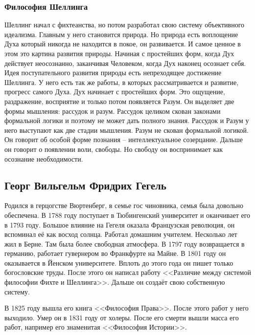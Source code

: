\subsubsection{Философия Шеллинга}

Шеллинг начал с фихтеанства, но потом разработал свою систему объективного идеализма. Главным у него становится природа. Но природа есть воплощение Духа который никогда не находится в покое, он развивается. И самое ценное в этом это картина развития природы. Начиная с простейших форм, когда Дух действует неосознанно, заканчивая Человеком, когда Дух наконец осознает себя. Идея поступательного развития природы есть непреходящее достижение Шеллинга. У него есть так же работы, в которых рассматривается и развитие, прогресс самого Духа. Дух начинает с простейших форм. Это ощущение, раздражение, восприятие и только потом появляется Разум. Он выделяет две формы мышления: рассудок и разум. Рассудок целиком скован законами формальной логики и поэтому не может дать полного знания. Рассудок и Разум у него выступают как две стадии мышления. Разум не скован формальной логикой. Он говорит об особой форме познания – интеллектуальное созерцание. Дальше он говорит о появлении воли, свободы. Но свободу он воспринимает как осознание необходимости.

\subsection{Георг Вильгельм Фридрих Гегель}

Родился в герцогстве Вюртенберг, в семье гос чиновника, семья была довольно обеспечена. В 1788 году поступает в Тюбингенский университет и оканчивает его в 1793 году. Большое влияние на Гегеля оказала Французская революция, он вспоминал её как восход солнца. Работал домашним учителем. Несколько лет жил в Берне. Там была более свободная атмосфера. В 1797 году возвращается в германию, работает гувернером во Франкфурте на Майне. В 1801 году он оказывается в Йенском университете. Вплоть до этого года он пишет только богословские труды. После этого он написал работу <<Различие между системой философии Фихте и Шеллинга>>. Дальше он создаёт свою собственную систему.

В 1825 году вышла его книга <<Философия Права>>. После этого работ у него выходило. Умер он в 1831 году от холеры. После его смерти вышли масса его работ, например его знаменитая <<Философия Истории>>.
